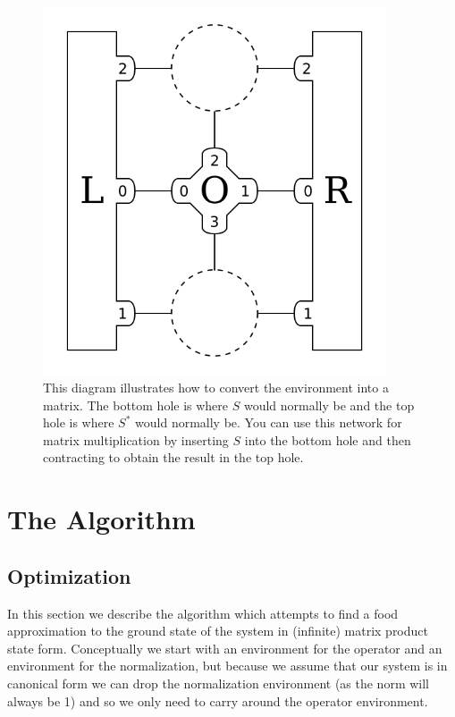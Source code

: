 \documentclass{article}
\newcommand{\diagramwidth}{4in}
\begin{document}
\begin{figure}\begin{center}
\includegraphics[width=\diagramwidth]{drawings/matmul-car}
\caption{\label{fig:matmul-car}This diagram illustrates how to convert the environment into a matrix.  The bottom hole is where $S$ would normally be and the top hole is where $S^*$ would normally be.  You can use this network for matrix multiplication by inserting $S$ into the bottom hole and then contracting to obtain the result in the top hole.}
\end{center}\end{figure}

\clearpage

\section{The Algorithm}

\subsection{Optimization}

In this section we describe the algorithm which attempts to find a food approximation to the ground state of the system in (infinite) matrix product state form.  Conceptually we start with an environment for the operator and an environment for the normalization, but because we assume that our system is in canonical form we can drop the normalization environment (as the norm will always be 1) and so we only need to carry around the operator environment.
\end{document}
